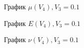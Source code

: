 \documentclass[12pt,a4paper]{article}
\begin{document}
    \pagebreak

    \begin{figure}[h]
        \caption{График $\mu(V_4), V_3 = 0.1$}
    \end{figure}

    \begin{figure}[h]
        \caption{График $E(V_4), V_3 = 0.1$}
    \end{figure}

    \pagebreak

    \begin{figure}[h]
        \caption{График $\nu(V_4), V_3 = 0.1$}
    \end{figure}
\end{document}
